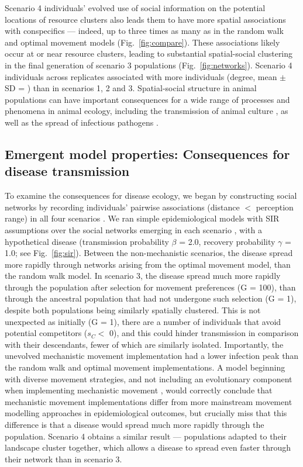 Scenario 4 individuals' evolved use of social information on the potential locations of resource clusters also leads them to have more spatial associations with conspecifics --- indeed, up to three times as many as in the random walk and optimal movement models (Fig.~\ref{fig:compare}).
These associations likely occur at or near resource clusters, leading to substantial spatial-social clustering in the final generation of scenario 3 populations (Fig.~\ref{fig:networks}).
Scenario 4 individuals across replicates associated with more individuals (degree, mean $\pm$ SD = ) than in scenarios 1, 2 and 3.
Spatial-social structure in animal populations can have important consequences for a wide range of processes and phenomena in animal ecology, including the transmission of animal culture \citep[such as foraging tactics or migration routes][]{romano2020,romano2021,jesmer2018,klump2021}, as well as the spread of infectious pathogens \citep{white2017,white2018,white2018b,webber2022,ezenwa2016,albery2020}.

\subsection{Emergent model properties: Consequences for disease transmission}

To examine the consequences for disease ecology, we began by constructing social networks by recording individuals' pairwise associations (distance $<$ perception range) in all four scenarios \citep{farine2015}.
We ran simple epidemiological models with SIR assumptions over the social networks emerging in each scenario \citep[25 replicates per network; 1 network per scenario replicate][]{white2017,csardi2006,bailey1975}, with a hypothetical disease (transmission probability $\beta$ = 2.0, recovery probability $\gamma$ = 1.0; see Fig.~\ref{fig:sir}).
Between the non-mechanistic scenarios, the disease spread more rapidly through networks arising from the optimal movement model, than the random walk model.
In scenario 3, the disease spread much more rapidly through the population after selection for movement preferences (G = 100), than through the ancestral population that had not undergone such selection (G = 1), despite both populations being similarly spatially clustered.
This is not unexpected as initially (G = 1), there are a number of individuals that avoid potential competitors ($s_C <$ 0), and this could hinder transmission in comparison with their descendants, fewer of which are similarly isolated.
Importantly, the unevolved mechanistic movement implementation had a lower infection peak than the random walk and optimal movement implementations.
A model beginning with diverse movement strategies, and not including an evolutionary component when implementing mechanistic movement \citep[such as][]{white2018}, would correctly conclude that mechanistic movement implementations differ from more mainstream movement modelling approaches in epidemiological outcomes, but crucially miss that this difference is that a disease would spread much more rapidly through the population.
Scenario 4 obtains a similar result --- populations adapted to their landscape cluster together, which allows a disease to spread even faster through their network than in scenario 3.


